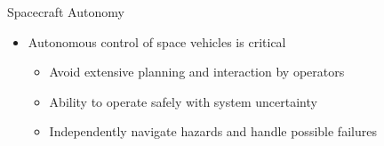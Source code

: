 \begin{frame}[t]{Spacecraft Autonomy} %
\begin{itemize}
    \item Autonomous control of space vehicles is critical
    \begin{itemize}
        \item Avoid extensive planning and interaction by operators
        \item Ability to operate safely with system uncertainty 
        \item Independently navigate hazards and handle possible failures
    \end{itemize}
\end{itemize}
\end{frame}   %
